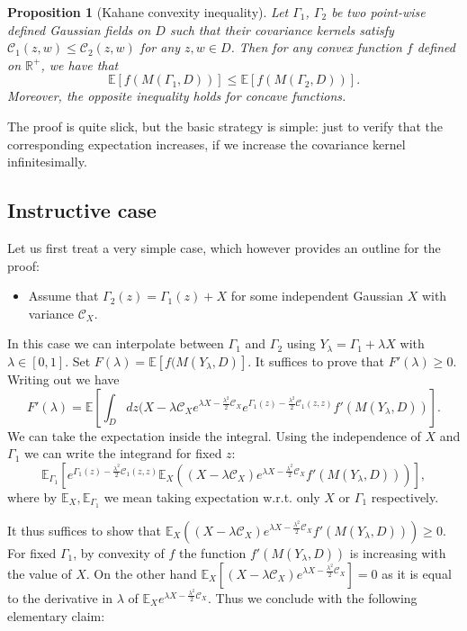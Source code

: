 \documentclass[11pt]{amsart}
\newtheorem{prop}[thm]{Proposition}
\newcommand{\R}{\mathbb R}
\newcommand{\C}{\mathcal C}
\newcommand{\E}{\mathbb E}
\renewcommand{\1}{\mathbf 1}
\begin{document}
\begin{prop}[Kahane convexity inequality]\label{prop:KCI}
Let $\Gamma_1$, $\Gamma_2$ be two point-wise defined Gaussian fields on $D$ such that their covariance kernels satisfy $\C_1(z,w) \leq \C_2(z,w)$ for any $z,w \in D$. Then for any convex function $f$ defined on $\R^+$, we have that 
$$\E \left[ f(M(\Gamma_1, D))\right] \leq \E \left[ f(M(\Gamma_2, D))\right].$$
Moreover, the opposite inequality holds for concave functions.
\end{prop}

The proof is quite slick, but the basic strategy is simple: just to verify that the corresponding expectation increases, if we increase the covariance kernel infinitesimally. 

\subsection*{Instructive case} Let us first treat a very simple case, which however provides an outline for the proof:
\begin{itemize}
\item Assume that $\Gamma_2(z) = \Gamma_1(z) + X$ for some independent Gaussian $X$ with variance $\C_X$. 
\end{itemize}
In this case we can interpolate between $\Gamma_1$ and $\Gamma_2$ using $Y_\lambda = \Gamma_1 + \lambda X$ with $\lambda \in [0,1]$. Set $F(\lambda) = \E \left[ f(M(Y_\lambda, D)\right]$. It suffices to prove that $F'(\lambda) \geq 0$. Writing out we have
$$F'(\lambda) = \E \left[\int_D dz (X - \lambda \C_X e^{\lambda X - \frac{\lambda^2}{2}\C_X}e^{\Gamma_1(z) - \frac{\lambda^2}{2}\C_1(z,z)}f'(M(Y_\lambda, D))\right].$$
We can take the expectation inside the integral. Using the independence of $X$ and $\Gamma_1$ we can write the integrand for fixed $z$:
$$\E_{\Gamma_1}\left[e^{\Gamma_1(z) - \frac{\lambda^2}{2}\C_1(z,z)}\E_X\left((X - \lambda \C_X)e^{\lambda X - \frac{\lambda^2}{2}\C_X}f'(M(Y_\lambda, D))\right)\right],$$
where by $\E_X, \E_{\Gamma_1}$ we mean taking expectation w.r.t. only $X$ or $\Gamma_1$ respectively.

It thus suffices to show that $\E_X\left((X - \lambda \C_X)e^{\lambda X - \frac{\lambda^2}{2}\C_X}f'(M(Y_\lambda, D))\right) \geq 0$. For fixed $\Gamma_1$, by convexity of $f$ the function $f'(M(Y_\lambda, D))$ is increasing with the value of $X$. On the other hand $\E_X\left[(X - \lambda \C_X)e^{\lambda X - \frac{\lambda^2}{2}\C_X}\right] = 0$ as it is equal to the derivative in $\lambda$ of $\E_X e^{\lambda X - \frac{\lambda^2}{2}\C_X}$. Thus we conclude with the following elementary claim:
\end{document}
